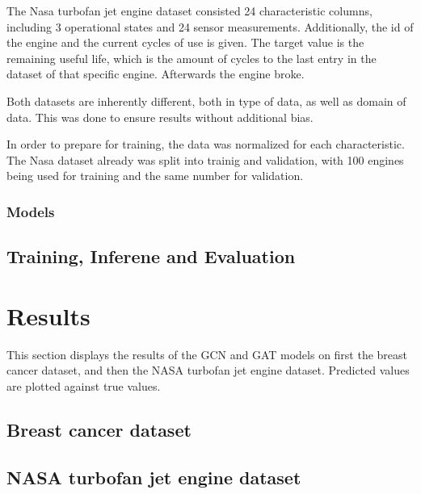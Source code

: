 \documentclass[12pt]{article}
\begin{document}
The Nasa turbofan jet engine dataset consisted 24 characteristic columns, including 3 operational states and 24 sensor measurements. Additionally, the id of the engine and the current cycles of use is given. The target value is the remaining useful life, which is the amount of cycles to the last entry in the dataset of that specific engine. Afterwards the engine broke.

Both datasets are inherently different, both in type of data, as well as domain of data. This was done to ensure results without additional bias.

In order to prepare for training, the data was normalized for each characteristic. The Nasa dataset already was split into trainig and validation, with 100 engines being used for training and the same number for validation.

\subsubsection{Models}

\subsection{Training, Inferene and Evaluation}

\pagebreak
\section{Results}
This section displays the results of the GCN and GAT models on first the breast cancer dataset, and then the NASA turbofan jet engine dataset. Predicted values are plotted against true values.

\subsection{Breast cancer dataset}

\subsection{NASA turbofan jet engine dataset}
\end{document}
